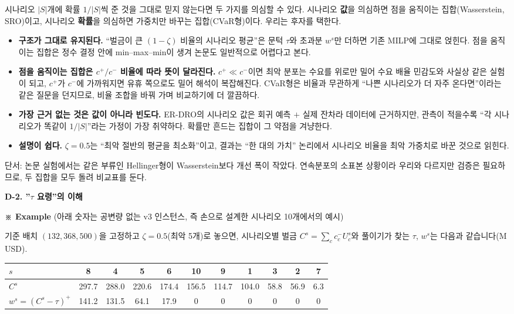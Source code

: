 \documentclass[10pt,a4paper]{article}
\newcommand{\hd}[1]{\par\vspace{8pt}\textbf{#1}\par\vspace{3pt}}
\begin{document}
시나리오 $|S|$개에 확률 $1/|S|$씩 준 것을 그대로 믿지 않는다면 두 가지를 의심할 수 있다.
시나리오 \textbf{값}을 의심하면 점을 움직이는 집합(Wasserstein, SRO)이고, 시나리오 \textbf{확률}을 의심하면
가중치만 바꾸는 집합(CVaR형)이다. 우리는 후자를 택한다.
\begin{itemize}[leftmargin=1.5em]
\item \textbf{구조가 그대로 유지된다.} ``벌금이 큰 $(1-\zeta)$ 비율의 시나리오 평균''은 문턱 $\tau$와 초과분 $w^s$만 더하면 기존 MILP에 그대로 얹힌다. 점을 움직이는 집합은 정수 결정 안에 min--max--min이 생겨 논문도 일반적으로 어렵다고 본다.
\item \textbf{점을 움직이는 집합은 $c^+/c^-$ 비율에 따라 뜻이 달라진다.} $c^+\ll c^-$이면 최악 분포는
수요를 위로만 밀어 수요 배율 민감도와 사실상 같은 실험이 되고, $c^+$가 $c^-$에 가까워지면 유휴 쪽으로도
밀어 해석이 복잡해진다. CVaR형은 비율과 무관하게 ``나쁜 시나리오가 더 자주 온다면''이라는 같은 질문을
던지므로, 비율 조합을 바꿔 가며 비교하기에 더 깔끔하다.
\item \textbf{가장 근거 없는 것은 값이 아니라 빈도다.} ER-DRO의 시나리오 값은 회귀 예측 $+$ 실제 잔차라 데이터에 근거하지만, 관측이 적을수록 ``각 시나리오가 똑같이 $1/|S|$''라는 가정이 가장 취약하다. 확률만 흔드는 집합이 그 약점을 겨냥한다.
\item \textbf{설명이 쉽다.} $\zeta=0.5$는 ``최악 절반의 평균을 최소화''이고, 결과는 ``한 대의 가치'' 논리에서 시나리오 비율을 최악 가중치로 바꾼 것으로 읽힌다.
\end{itemize}
단서: 논문 실험에서는 같은 부류인 Hellinger형이 Wasserstein보다 개선 폭이 작았다. 연속분포의 소표본 상황이라 우리와 다르지만 검증은 필요하므로, 두 집합을 모두 돌려 비교표를 둔다.



\hd{D-2. ''$\tau$ 요령''의 이해}

\textbf{※ Example}
(아래 숫자는 공변량 없는 v3 인스턴스, 즉 손으로 설계한 시나리오 10개에서의 예시)

기준 배치 $(132,368,500)$을 고정하고 $\zeta=0.5$(최악 5개)로 놓으면, 시나리오별 벌금
$C^{s}=\sum_c c^-_cU^s_c$와 풀이기가 찾는 $\tau$, $w^{s}$는 다음과 같습니다(M USD).

\begin{center}
\begin{tabular}{lcccccccccc}
\toprule
$s$ & 8 & 4 & 5 & 6 & 10 & 9 & 1 & 3 & 2 & 7 \\ \midrule
$C^{s}$ & 297.7 & 288.0 & 220.6 & 174.4 & 156.5 & 114.7 & 104.0 & 58.8 & 56.9 & 6.3 \\
$w^{s}=(C^{s}-\tau)^+$ & 141.2 & 131.5 & 64.1 & 17.9 & 0 & 0 & 0 & 0 & 0 & 0 \\
\bottomrule
\end{tabular}
\end{center}
\end{document}
